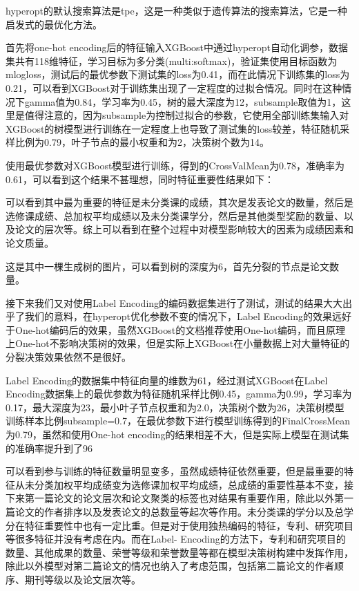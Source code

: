 hyperopt的默认搜索算法是tpe，这是一种类似于遗传算法的搜索算法，它是一种启发式的最优化方法。

首先将one-hot encoding后的特征输入XGBoost中通过hyperopt自动化调参，数据集共有118维特征，学习目标为多分类(multi:softmax)，验证集使用目标函数为mlogloss，测试后的最优参数下测试集的loss为0.41，而在此情况下训练集的loss为0.21，可以看到XGBoost对于训练集出现了一定程度的过拟合情况。同时在这种情况下gamma值为0.84，学习率为0.45，树的最大深度为12，subsample取值为1，这里是值得注意的，因为subsample为控制过拟合的参数，它使用全部训练集输入对XGBoost的树模型进行训练在一定程度上也导致了测试集的loss较差，特征随机采样比例为0.79，叶子节点的最小权重和为2，决策树个数为14。

使用最优参数对XGBoost模型进行训练，得到的CrossValMean为0.78，准确率为0.61，可以看到这个结果不甚理想，同时特征重要性结果如下：




可以看到其中最为重要的特征是未分类课的成绩，其次是发表论文的数量，然后是选修课成绩、总加权平均成绩以及未分类课学分，然后是其他类型奖励的数量、以及论文的层次等。综上可以看到在整个过程中对模型影响较大的因素为成绩因素和论文质量。




这是其中一棵生成树的图片，可以看到树的深度为6，首先分裂的节点是论文数量。

接下来我们又对使用Label Encoding的编码数据集进行了测试，测试的结果大大出乎了我们的意料，在hyperopt优化参数不变的情况下，Label Encoding的效果远好于One-hot编码后的效果，虽然XGBoost的文档推荐使用One-hot编码，而且原理上One-hot不影响决策树的效果，但是实际上XGBoost在小量数据上对大量特征的分裂决策效果依然不是很好。

Label Encoding的数据集中特征向量的维数为61，经过测试XGBoost在Label Encoding数据集上的最优参数为特征随机采样比例0.45，gamma为0.99，学习率为0.17，最大深度为23，最小叶子节点权重和为2.0，决策树个数为26，决策树模型训练样本比例subsample=0.7，在最优参数下进行模型训练得到的FinalCrossMean为0.79，虽然和使用One-hot encoding的结果相差不大，但是实际上模型在测试集的准确率提升到了96%




可以看到参与训练的特征数量明显变多，虽然成绩特征依然重要，但是最重要的特征从未分类加权平均成绩变为选修课加权平均成绩，总成绩的重要性基本不变，接下来第一篇论文的论文层次和论文聚类的标签也对结果有重要作用，除此以外第一篇论文的作者排序以及发表论文的总数量等起次等作用。未分类课的学分以及总学分在特征重要性中也有一定比重。但是对于使用独热编码的特征，专利、研究项目等很多特征并没有考虑在内。而在Label- Encoding的方法下，专利和研究项目的数量、其他成果的数量、荣誉等级和荣誉数量等都在模型决策树构建中发挥作用，除此以外模型对第二篇论文的情况也纳入了考虑范围，包括第二篇论文的作者顺序、期刊等级以及论文层次等。

